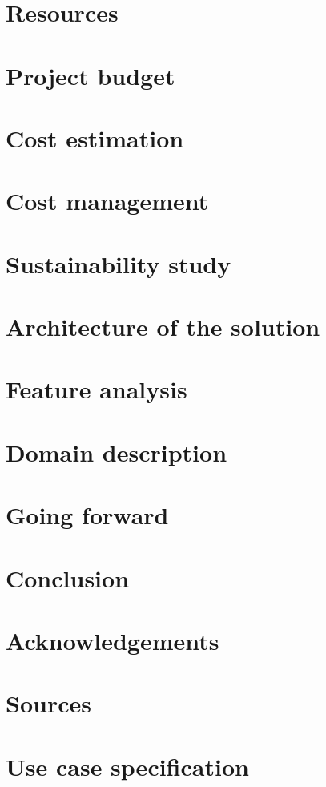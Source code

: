 \documentclass{report}
\begin{document}
    \chapter{Resources}
    
    
    \chapter{Project budget}
    
    
    \chapter{Cost estimation}
    
    
    \chapter{Cost management}
    
    
    \chapter{Sustainability study}
    
    
    \chapter{Architecture of the solution}
    
    
    \chapter{Feature analysis}
    
    
    \chapter{Domain description}
    

    \chapter{Going forward}
    

    \chapter{Conclusion}
    

    \chapter{Acknowledgements}
    

    

    \appendix
        \chapter{Sources}
        

        \chapter{Use case specification}
        
\end{document}

